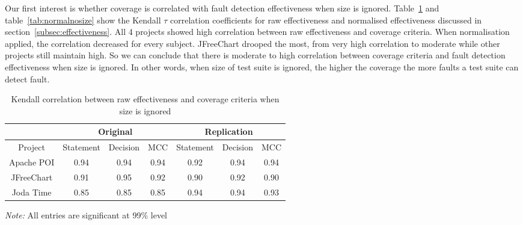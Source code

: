 Our first interest is whether coverage is correlated with fault detection effectiveness when size is ignored. Table~\ref{tab:rawnosize} and table~\ref{tab:normalnosize} show the Kendall $\tau$ correlation coefficients for raw effectiveness and normalised effectiveness discussed in section~\ref{subsec:effectiveness}. All 4 projects showed high correlation between raw effectiveness and coverage criteria. When normalisation applied, the correlation decreased for every subject. JFreeChart drooped the most, from very high correlation to moderate while other projects still maintain high. So we can conclude that there is moderate to high correlation between coverage criteria and fault detection effectiveness when size is ignored. In other words, when size of test suite is ignored, the higher the coverage the more faults a test suite can detect fault. 

\begin{table}[h]
	\caption{Kendall correlation between raw effectiveness and coverage criteria when size is ignored}
	\label{tab:rawnosize}
	\begin{minipage}{0.7\columnwidth}
		\begin{center}
			\begin{tabular}{cccc|ccc}
				\hline
				& \multicolumn{3}{c}{Original} & \multicolumn{3}{c}{Replication} \\
				\hline
				Project & Statement & Decision & MCC & Statement & Decision & MCC  \\
				\hline
				Apache POI & 0.94 & 0.94 & 0.94 & 0.92 & 0.94 & 0.94 \\
				JFreeChart & 0.91 & 0.95 & 0.92 & 0.90 & 0.92 & 0.90\\
				Joda Time & 0.85 & 0.85 & 0.85 & 0.94 & 0.94 & 0.93 \\
				\hline
			\end{tabular}
		\end{center}
		\bigskip
		\emph{Note:} All entries are significant at 99\% level
	\end{minipage}
\end{table}

